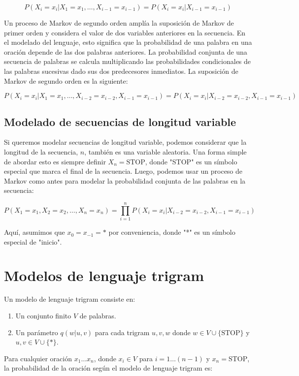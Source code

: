 \[
P(X_i = x_i|X_1 = x_1, \ldots, X_{i-1} = x_{i-1}) = P(X_i = x_i|X_{i-1} = x_{i-1})
\]


Un proceso de Markov de segundo orden amplía la suposición de Markov de primer orden y considera el valor de dos variables anteriores en la secuencia. En el modelado del lenguaje, esto significa que la probabilidad de una palabra en una oración depende de las dos palabras anteriores. La probabilidad conjunta de una secuencia de palabras se calcula multiplicando las probabilidades condicionales de las palabras sucesivas dado sus dos predecesores inmediatos. La suposición de Markov de segundo orden es la siguiente:

\[
P(X_i = x_i|X_1 = x_1, \ldots, X_{i-2} = x_{i-2}, X_{i-1} = x_{i-1}) = P(X_i = x_i|X_{i-2} = x_{i-2}, X_{i-1} = x_{i-1})
\]

\subsection{Modelado de secuencias de longitud variable}

Si queremos modelar secuencias de longitud variable, podemos considerar que la longitud de la secuencia, $n$, también es una variable aleatoria. Una forma simple de abordar esto es siempre definir $X_n = \text{STOP}$, donde "STOP" es un símbolo especial que marca el final de la secuencia. Luego, podemos usar un proceso de Markov como antes para modelar la probabilidad conjunta de las palabras en la secuencia:

\[
P(X_1 = x_1, X_2 = x_2, \ldots, X_n = x_n) = \prod_{i=1}^{n} P(X_i = x_i|X_{i-2} = x_{i-2}, X_{i-1} = x_{i-1})
\]

Aquí, asumimos que $x_0 = x_{-1} = *$ por conveniencia, donde "*" es un símbolo especial de "inicio".

\section{Modelos de lenguaje trigram}

Un modelo de lenguaje trigram consiste en:

\begin{enumerate}
  \item Un conjunto finito $V$ de palabras.
  \item Un parámetro $q(w|u, v)$ para cada trigram $u, v, w$ donde $w \in V \cup \{\text{STOP}\}$ y $u, v \in V \cup \{*\}$.
\end{enumerate}

Para cualquier oración $x_1 \ldots x_n$, donde $x_i \in V$ para $i = 1 \ldots (n-1)$ y $x_n = \text{STOP}$, la probabilidad de la oración según el modelo de lenguaje trigram es:

